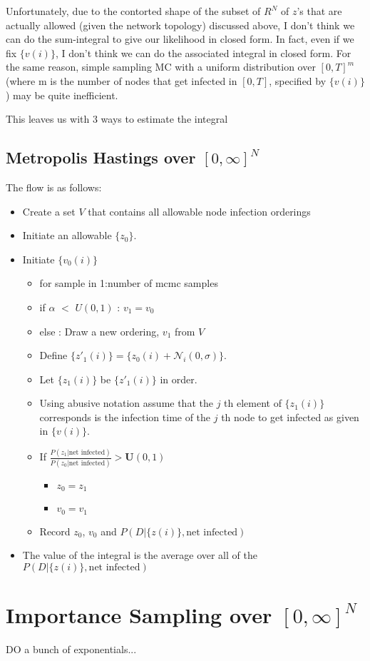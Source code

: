 \documentclass{article}
\begin{document}
Unfortunately, due to the contorted shape of the subset of
$R^N$ of $z$'s that are actually allowed (given the network topology)
discussed above, I don't think we can do the sum-integral to give our
likelihood in closed form. In fact, even if we fix $\{v(i)\}$, I don't
think we can do the associated integral in closed form. For the same
reason, simple sampling MC with a uniform distribution over $[0, T]^m$
(where m is the number of nodes that get infected in $[0, T]$, specified
by $\{v(i)\}$) may be quite inefficient.

This leaves us with 3 ways to estimate the integral

\subsection{Metropolis Hastings over $[0, \infty]^N$}

The flow is as follows:
\begin{itemize}
\item Create a set $V$ that contains all allowable node infection orderings
\item Initiate an allowable $\{z_0\}$.
\item Initiate $\{v_0(i)\}$
\begin{itemize}
\item for sample in 1:number of mcmc samples
\item if $\alpha$ $<$ $U(0,1)$ : $v_1 = v_0$
\item else : Draw a new ordering, $v_1$ from $V$
\item Define $\{z'_1(i)\} = \{z_0(i) + \mathcal{N}_i(0, \sigma)\}$.
\item Let $\{z_1(i)\}$ be $\{z'_1(i)\}$ in order.
\item Using abusive notation assume that the $j$ th element of $\{z_1(i)\}$ corresponds is the infection time of the $j$ th node to get
infected as given in $\{v(i)\}$.
\item If $\frac{P(z_1 | \text{net infected})}{P(z_0 | \text{net infected})} > \mathbf{U}(0,1)$
\begin{itemize}
\item $z_0 =z_1$
\item $v_0 = v_1$
\end{itemize}
\item Record $z_0$, $v_0$ and $P(D | \{z(i)\}, \text{net infected} )$
\end{itemize}
\item The value of the integral is the average over all of the $P(D | \{z(i)\}, \text{net infected} )$
\end{itemize}

\section{Importance Sampling over $[0, \infty]^N$}

DO a bunch of exponentials...
\end{document}
